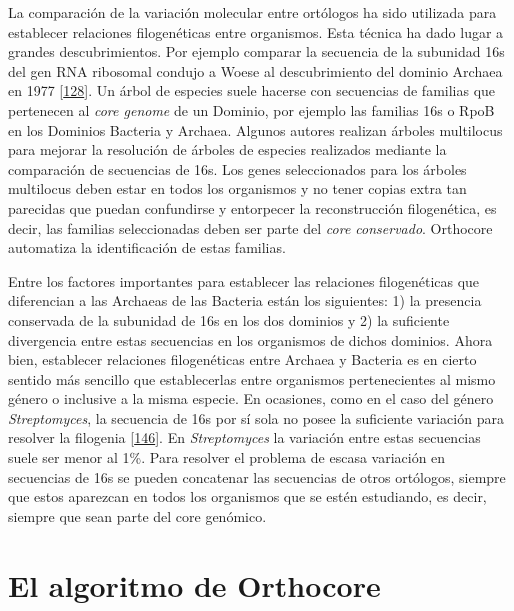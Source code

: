\documentclass[12pt,twoside]{reedthesis}
\begin{document}
  La comparación de la variación molecular entre ortólogos ha sido
  utilizada para establecer relaciones filogenéticas entre organismos.
  Esta técnica ha dado lugar a grandes descubrimientos. Por ejemplo
  comparar la secuencia de la subunidad 16s del gen RNA ribosomal condujo
  a Woese al descubrimiento del dominio Archaea en 1977
  {[}\protect\hyperlink{ref-woese_phylogenetic_1977}{128}{]}. Un árbol de
  especies suele hacerse con secuencias de familias que pertenecen al
  \emph{core genome} de un Dominio, por ejemplo las familias 16s o RpoB en
  los Dominios Bacteria y Archaea. Algunos autores realizan árboles
  multilocus para mejorar la resolución de árboles de especies realizados
  mediante la comparación de secuencias de 16s. Los genes seleccionados
  para los árboles multilocus deben estar en todos los organismos y no
  tener copias extra tan parecidas que puedan confundirse y entorpecer la
  reconstrucción filogenética, es decir, las familias seleccionadas deben
  ser parte del \emph{core conservado}. Orthocore automatiza la
  identificación de estas familias.
  
  Entre los factores importantes para establecer las relaciones
  filogenéticas que diferencian a las Archaeas de las Bacteria están los
  siguientes: 1) la presencia conservada de la subunidad de 16s en los dos
  dominios y 2) la suficiente divergencia entre estas secuencias en los
  organismos de dichos dominios. Ahora bien, establecer relaciones
  filogenéticas entre Archaea y Bacteria es en cierto sentido más sencillo
  que establecerlas entre organismos pertenecientes al mismo género o
  inclusive a la misma especie. En ocasiones, como en el caso del género
  \emph{Streptomyces}, la secuencia de 16s por sí sola no posee la
  suficiente variación para resolver la filogenia
  {[}\protect\hyperlink{ref-labeda_phylogenetic_2017}{146}{]}. En
  \emph{Streptomyces} la variación entre estas secuencias suele ser menor
  al 1\%. Para resolver el problema de escasa variación en secuencias de
  16s se pueden concatenar las secuencias de otros ortólogos, siempre que
  estos aparezcan en todos los organismos que se estén estudiando, es
  decir, siempre que sean parte del core genómico.
  
  \section{El algoritmo de Orthocore}\label{el-algoritmo-de-orthocore}
  
\end{document}
